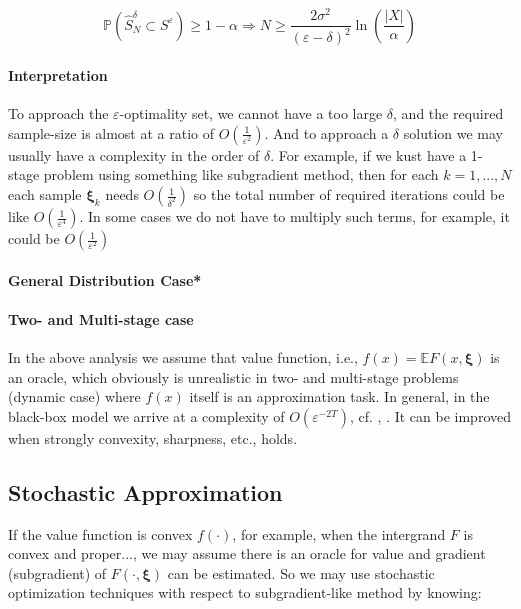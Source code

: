\documentclass[a4pper,10pt]{article}
\newcommand{\ex}{\mathbb E}
\newcommand{\pr}{\mathbb P}
\begin{document}
$$\pr\left(\hat{S}_{N}^{\delta} \subset S^{\varepsilon}\right) \geq 1-\alpha \Rightarrow N \geq \frac{2 \sigma^{2}}{(\varepsilon-\delta)^{2}} \ln \left(\frac{|X|}{\alpha}\right)$$


\paragraph{Interpretation} To approach the \(\varepsilon\)-optimality set, we cannot have a too large \(\delta\), and the required sample-size is almost at a ratio of \(O(\frac{1}{\varepsilon^2})\). And to approach a \(\delta\) solution we may usually have a complexity in the order of \(\delta\). For example, if we kust have a 1-stage problem using something like subgradient method, then for each \(k = 1, ..., N\) each sample \(\bm \xi_k\) needs \(O(\frac{1}{\delta^2})\) so the total number of required iterations could be like $O\left(\frac{1}{\varepsilon^4}\right)$. In some cases we do not have to multiply such terms, for example, it could be $O\left(\frac{1}{\varepsilon^2}\right)$

\paragraph{General Distribution Case*}

\paragraph{Two- and Multi-stage case}
In the above analysis we assume that value function, i.e., $f(x) =\ex F(x, \bm \xi)$ is an oracle, which obviously is unrealistic in two- and multi-stage problems (dynamic case) where $f(x)$ itself is an approximation task. In general, in the black-box model we arrive at a complexity of $O(\varepsilon^{-2T})$, cf. \citet{shapiro_complexity_2006}, \citet{nemirovski_complexity_2006}. It can be improved when strongly convexity, sharpness, etc., holds.


\subsection{Stochastic Approximation}

If the value function is convex \(f(\cdot)\), for example, when the intergrand \(F\) is convex and proper..., we may assume there is an oracle for value and gradient (subgradient) of \(F(\cdot, \bm \xi)\) can be estimated. So we may use stochastic optimization techniques with respect to subgradient-like method by knowing:
\end{document}
